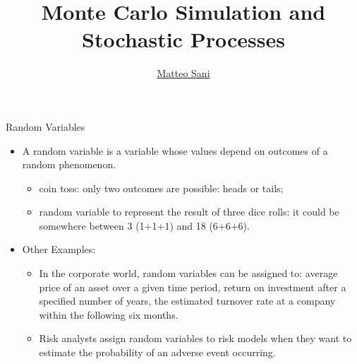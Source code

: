 \documentclass{beamer}
\title{Monte Carlo Simulation and Stochastic Processes}
\author{\href{mailto:matteo.sani@unisi.it}{Matteo Sani}}
\begin{document}
\begin{frame}[plain]
	\maketitle
\end{frame}

\begin{frame}{Random Variables}
	\begin{itemize}
		\item A random variable is a variable whose values depend on outcomes of a random phenomenon.
        \begin{itemize}
        \item coin toss: only two outcomes are possible: heads or tails;
        \item random variable to represent the result of three dice rolls: it could be somewhere between 3 (1+1+1) and 18 (6+6+6).
        \end{itemize}

        \item Other Examples:
        \begin{itemize}
            \item In the corporate world, random variables can be assigned to: average price of an asset over a given time period, return on investment after a specified number of years, the estimated turnover rate at a company within the following six months. 
            \item Risk analysts assign random variables to risk models when they want to estimate the probability of an adverse event occurring.
        \end{itemize}
       
%		
	\end{itemize}
\end{frame}
\end{document}
